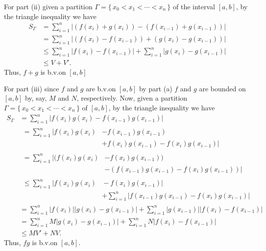 \begin{solution}
  For part (ii) given a partition $\Gamma=\{\,x_0<x_1<\cdots<x_n\,\}$ of
  the interval $[a,b]$, by the triangle inequality we have
  \begin{align*}
    S_\Gamma
    &=\sum_{i=1}^n\left|(f(x_i)+g(x_i))-(f(x_{i-1})+g(x_{i-1}))\right|\\
    &=\sum_{i=1}^n\left|(f(x_i)-f(x_{i-1}))+(g(x_i)-g(x_{i-1}))\right|\\
    &\leq\sum_{i=1}^n|f(x_i)-f(x_{i-1})|+\sum_{i=1}^n|g(x_i)-g(x_{i-1})|\\
    &\leq V+V'.
  \end{align*}
  Thus, $f+g$ is b.v.\@ on $[a,b]$

  For part (iii) since $f$ and $g$ are b.v.\@ on $[a,b]$ by part (a) $f$
  and $g$ are bounded on $[a,b]$ by, say, $M$ and $N$, respectively. Now,
  given a partition $\Gamma=\{\,x_0<x_1<\cdots<x_n\,\}$ of $[a,b]$, by the
  triangle inequality we have
  \begin{align*}
    S_{\Gamma}
    &=\sum_{i=1}^n\left|f(x_i)g(x_i)-f(x_{i-1})g(x_{i-1})\right|\\
    &\begin{aligned} =\sum_{i=1}^n
      \left|f(x_i)g(x_i)\right.{}&{}\left.-f(x_{i-1})g(x_{i-1})\right.\\
      &\left.+f(x_i)g(x_{i-1})-f(x_i)g(x_{i-1})\right|
    \end{aligned}\\
    &\begin{aligned} =\sum_{i=1}^n
      \left|(f(x_i)g(x_i)\right.{}&{}\left.-f(x_i)g(x_{i-1}))\right.\\
      &\left.-(f(x_{i-1})g(x_{i-1})-f(x_i)g(x_{i-1}))\right|
    \end{aligned}\\
    &\begin{aligned}
      \leq\sum_{i=1}^n|f(x_i)g(x_i){}&{}-f(x_i)g(x_{i-1})|\\
      &+\sum_{i=1}^n|f(x_{i-1})g(x_{i-1})-f(x_i)g(x_{i-1})|
    \end{aligned}\\
    &=\sum_{i=1}^n|f(x_i)||g(x_i)-g(x_{i-1})|+\sum_{i=1}^n|g(x_{i-1})||f(x_i)-f(x_{i-1})|\\
    &=\sum_{i=1}^n
      M|g(x_i)-g(x_{i-1})|+\sum_{i=1}^n N|f(x_i)-f(x_{i-1})|\\
    &\leq MV'+NV.
  \end{align*}
  Thus, $fg$ is b.v.\@ on $[a,b]$.


\end{solution}
